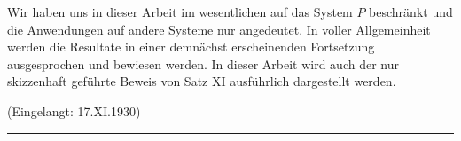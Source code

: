 \documentclass{scrartcl}
\begin{document}
Wir haben uns in dieser Arbeit im wesentlichen auf das System $P$ beschränkt und die Anwendungen auf andere Systeme nur angedeutet. In voller Allgemeinheit werden die Resultate in einer demnächst erscheinenden Fortsetzung ausgesprochen und bewiesen werden. In dieser Arbeit wird auch der nur skizzenhaft geführte Beweis von Satz XI ausführlich dargestellt werden.

\begin{center}
(Eingelangt: 17.XI.1930)
\end{center}
\vspace{0.5cm}
\begin{center}
\rule{2cm}{0.01cm}
\end{center}
\end{document}
